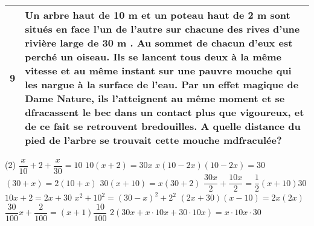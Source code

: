 \documentclass[a4paper,12pt]{report}
\begin{document}
\begin{tabularx}{\textwidth}{|c|X|}
\hline 9 & Un arbre haut de 10 m et un poteau haut de 2 m sont situés en face l'un de l'autre sur chacune des rives d'une rivière large de 30 m . Au sommet de chacun d'eux est perché un oiseau. Ils se lancent tous deux à la même vitesse et au même instant sur une pauvre mouche qui les nargue à la surface de l'eau. Par un effet magique de Dame Nature, ils l'atteignent au même moment et se dfracassent le bec dans un contact plus que vigoureux, et de ce fait se retrouvent bredouilles. A quelle distance du pied de l'arbre se trouvait cette mouche mdfraculée? \\
\hline
\end{tabularx}
\vspace{5pt}

\begin{tasks}(2)
\task $\dfrac{x}{10}+2+\dfrac{x}{30}=10$
\task $10(x+2)=30 x$
\task $x(10-2 x)(10-2 x)=30$
\task $(30+x)=2(10+x)$
\task $30(x+10)=x(30+2)$
\task $\dfrac{30 x}{2}+\dfrac{10 x}{2}=\dfrac{1}{2}(x+10) 30$
\task $10 x+2=2 x+30$
\task $x^2+10^2=(30-x)^2+2^2$
\task $(2 x+30)(x-10)=2 x(2 x)$
\task $\dfrac{30}{100} x+\dfrac{2}{100}=(x+1) \dfrac{10}{100}$
\task $2(30 x+x \cdot 10 x+30 \cdot 10 x)=x \cdot 10 x \cdot 30$
\end{tasks}
\end{document}
